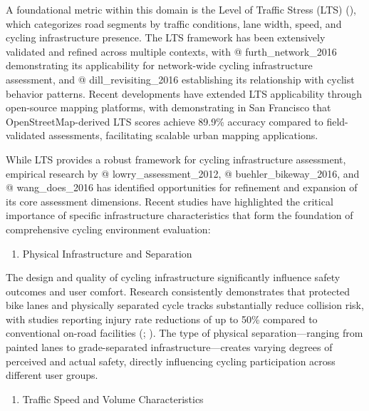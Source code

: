 \documentclass[
  12pt,
  oneside]{book}
\providecommand{\tightlist}{%
  \setlength{\itemsep}{0pt}\setlength{\parskip}{0pt}}
\begin{document}
A foundational metric within this domain is the Level of Traffic Stress (LTS) (\textcite{mekuria_low-stress_2012}), which categorizes road segments by traffic conditions, lane width, speed, and cycling infrastructure presence. The LTS framework has been extensively validated and refined across multiple contexts, with @ furth\_network\_2016 demonstrating its applicability for network-wide cycling infrastructure assessment, and @ dill\_revisiting\_2016 establishing its relationship with cyclist behavior patterns. Recent developments have extended LTS applicability through open-source mapping platforms, with \textcite{wasserman_evaluating_2019} demonstrating in San Francisco that OpenStreetMap-derived LTS scores achieve 89.9\% accuracy compared to field-validated assessments, facilitating scalable urban mapping applications.

While LTS provides a robust framework for cycling infrastructure assessment, empirical research by @ lowry\_assessment\_2012, @ buehler\_bikeway\_2016, and @ wang\_does\_2016 has identified opportunities for refinement and expansion of its core assessment dimensions. Recent studies have highlighted the critical importance of specific infrastructure characteristics that form the foundation of comprehensive cycling environment evaluation:

\begin{enumerate}
\def\labelenumi{\arabic{enumi}.}
\tightlist
\item
  Physical Infrastructure and Separation
\end{enumerate}

The design and quality of cycling infrastructure significantly influence safety outcomes and user comfort. Research consistently demonstrates that protected bike lanes and physically separated cycle tracks substantially reduce collision risk, with studies reporting injury rate reductions of up to 50\% compared to conventional on-road facilities (\textcite{harris_comparing_2013}; \textcite{reynolds_impact_2009}). The type of physical separation---ranging from painted lanes to grade-separated infrastructure---creates varying degrees of perceived and actual safety, directly influencing cycling participation across different user groups.

\begin{enumerate}
\def\labelenumi{\arabic{enumi}.}
\setcounter{enumi}{1}
\tightlist
\item
  Traffic Speed and Volume Characteristics
\end{enumerate}
\end{document}
